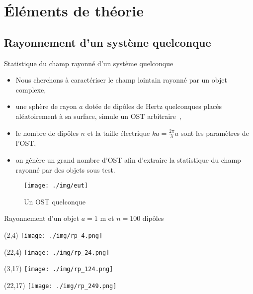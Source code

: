 \documentclass[]{beamer}
\begin{document}
\section{Éléments de théorie}
\subsection{Rayonnement d'un système quelconque}
\begin{frame}{Statistique du champ rayonné d'un système quelconque}
\begin{itemize}
    \item Nous cherchons à caractériser le champ lointain rayonné par un objet complexe,
    \item une sphère de rayon $a$ dotée de dipôles de Hertz quelconques placés aléatoirement à sa surface, simule un OST arbitraire~\cite{Wilson02},
    \item le nombre de dipôles $n$ et la taille électrique $ka=\frac{2\pi}{\lambda}a$ sont les paramètres de l'OST,
\item on génère un grand nombre d'OST afin d'extraire la statistique du champ rayonné par des objets sous test.

\end{itemize}
\centering
\begin{figure}
\texttt{[image: ./img/eut]}
\caption{Un OST quelconque}
\end{figure}
\end{frame}

\begin{frame}{Rayonnement d'un objet  $a=1$ m et $n=100$ dipôles}
\begin{textblock}{14}(2,4)
\texttt{[image: ./img/rp\_4.png]}
\end{textblock}
\begin{textblock}{14}(22,4)
\texttt{[image: ./img/rp\_24.png]}
\end{textblock}
\begin{textblock}{14}(3,17)
\texttt{[image: ./img/rp\_124.png]}
\end{textblock}
\begin{textblock}{14}(22,17)
\texttt{[image: ./img/rp\_249.png]}
\end{textblock}
\end{frame}
\end{document}

